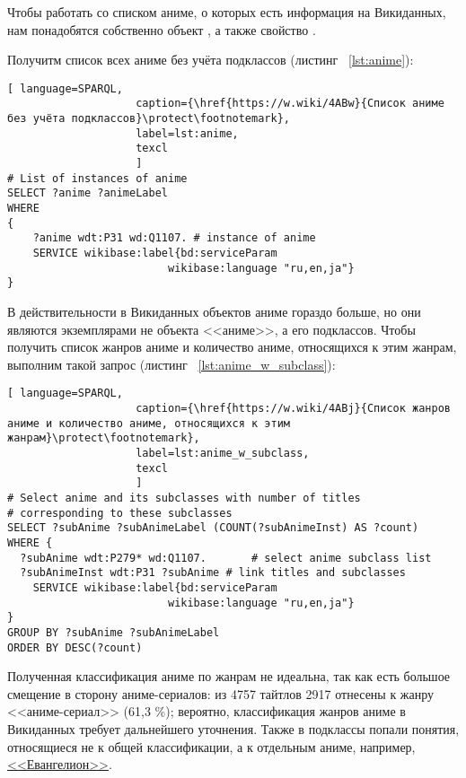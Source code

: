 Чтобы работать со списком аниме, о которых есть информация на Викиданных, нам понадобятся собственно объект , а также свойство .

Получитм список всех аниме без учёта подклассов (листинг ~\protect\ref{lst:anime}):

\begin{lstlisting}[ language=SPARQL, 
                    caption={\href{https://w.wiki/4ABw}{Список аниме без учёта подклассов}\protect\footnotemark},
                    label=lst:anime,
                    texcl 
                    ]
# List of instances of anime
SELECT ?anime ?animeLabel
WHERE
{
    ?anime wdt:P31 wd:Q1107. # instance of anime
    SERVICE wikibase:label{bd:serviceParam
					     wikibase:language "ru,en,ja"}
}
\end{lstlisting}%

В действительности в Викиданных объектов аниме гораздо больше, но они являются экземплярами не объекта <<аниме>>, а его подклассов. Чтобы получить список жанров аниме и количество аниме, относящихся к этим жанрам, выполним такой запрос (листинг ~\protect\ref{lst:anime_w_subclass}):

\begin{lstlisting}[ language=SPARQL, 
                    caption={\href{https://w.wiki/4ABj}{Список жанров аниме и количество аниме, относящихся к этим жанрам}\protect\footnotemark},
                    label=lst:anime_w_subclass,
                    texcl 
                    ]
# Select anime and its subclasses with number of titles
# corresponding to these subclasses
SELECT ?subAnime ?subAnimeLabel (COUNT(?subAnimeInst) AS ?count)
WHERE {
  ?subAnime wdt:P279* wd:Q1107.       # select anime subclass list
  ?subAnimeInst wdt:P31 ?subAnime # link titles and subclasses
    SERVICE wikibase:label{bd:serviceParam
					     wikibase:language "ru,en,ja"}
}
GROUP BY ?subAnime ?subAnimeLabel
ORDER BY DESC(?count)
\end{lstlisting}%

Полученная классификация аниме по жанрам не идеальна, так как есть большое смещение в сторону аниме-сериалов: из 4757 тайтлов 2917 отнесены к жанру <<аниме-сериал>> (61,3 \%); вероятно, классификация жанров аниме в Викиданных требует дальнейшего уточнения. Также в подклассы попали понятия, относящиеся не к общей классификации, а к отдельным аниме, например, \href{https://clck.ru/9cFfS}{<<Евангелион>>}.

